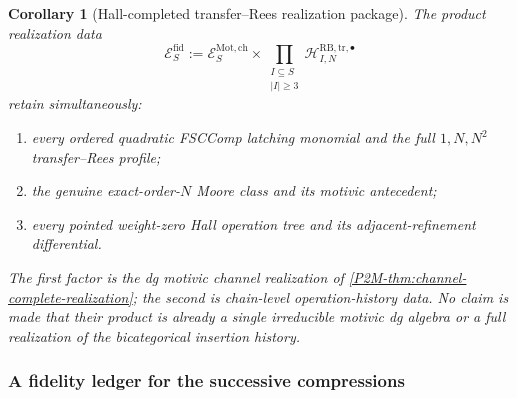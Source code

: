 \documentclass[11pt]{article}
\newtheorem{corollary}[theorem]{Corollary}
\theoremstyle{remark}
\newcommand{\Mot}{\mathrm{Mot}}
\begin{document}
\begin{corollary}[Hall-completed transfer--Rees realization package]
\label{P2M-cor:v14-hall-completed-package}
The product realization data
\begin{equation}\label{P2M-eq:v14-hall-completed-package}
 \boxed{
 \mathscr E_S^{\mathrm{fid}}
 :=\mathscr E_S^{\Mot,\mathrm{ch}}
 \times
 \prod_{\substack{I\subseteq S\\|I|\ge3}}
 \mathscr H_{I,N}^{\mathrm{RB,tr},\bullet}}
\end{equation}
retain simultaneously:
\begin{enumerate}[label=\textup{(\roman*)}]
\item every ordered quadratic FSCComp latching monomial and the full
      $1,N,N^2$ transfer--Rees profile;
\item the genuine exact-order-$N$ Moore class and its motivic antecedent;
\item every pointed weight-zero Hall operation tree and its
      adjacent-refinement differential.
\end{enumerate}
The first factor is the dg motivic channel realization of
\cref{P2M-thm:channel-complete-realization}; the second is chain-level
operation-history data.  No claim is made that their product is already a
single irreducible motivic dg algebra or a full realization of the
bicategorical insertion history.
\end{corollary}

\subsubsection{A fidelity ledger for the successive compressions}
\end{document}
